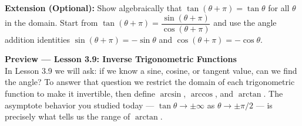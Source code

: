 \documentclass[10pt]{article}
\begin{document}
\vspace{0.06in}

\begin{extensionbox}
\textbf{Extension (Optional):}  Show algebraically that $\tan(\theta + \pi) = \tan\theta$
for all $\theta$ in the domain.  Start from
$\tan(\theta+\pi) = \dfrac{\sin(\theta+\pi)}{\cos(\theta+\pi)}$
and use the angle addition identities
$\sin(\theta+\pi) = -\sin\theta$ and $\cos(\theta+\pi)=-\cos\theta$.
\end{extensionbox}

\vspace{0.06in}

\begin{tcolorbox}[colback=navylight, colframe=navy, arc=2mm,
    left=3mm, right=3mm, top=2mm, bottom=2mm]
\small\textbf{Preview --- Lesson 3.9: Inverse Trigonometric Functions}\\
In Lesson 3.9 we will ask: if we know a sine, cosine, or tangent value, can we
find the angle?  To answer that question we restrict the domain of each
trigonometric function to make it invertible, then define $\arcsin$, $\arccos$,
and $\arctan$.  The asymptote behavior you studied today --- $\tan\theta\to\pm\infty$
as $\theta\to\pm\pi/2$ --- is precisely what tells us the range of $\arctan$.
\end{tcolorbox}
\end{document}
